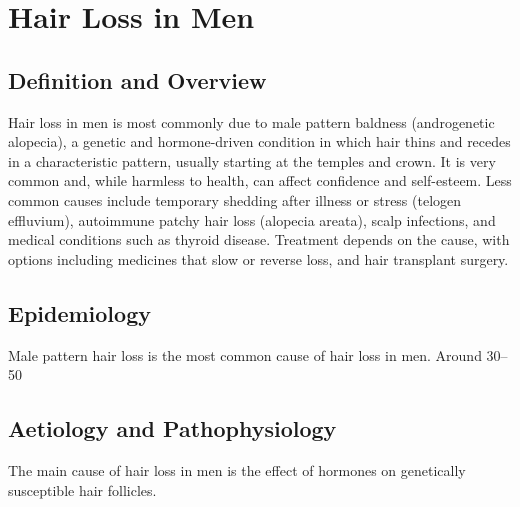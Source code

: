 \chapter{Hair Loss in Men}

\section*{Definition and Overview}
Hair loss in men is most commonly due to male pattern baldness (androgenetic alopecia), a genetic and hormone-driven condition in which hair thins and recedes in a characteristic pattern, usually starting at the temples and crown. It is very common and, while harmless to health, can affect confidence and self-esteem. Less common causes include temporary shedding after illness or stress (telogen effluvium), autoimmune patchy hair loss (alopecia areata), scalp infections, and medical conditions such as thyroid disease. Treatment depends on the cause, with options including medicines that slow or reverse loss, and hair transplant surgery.

\section*{Epidemiology}
Male pattern hair loss is the most common cause of hair loss in men. Around 30--50%

\section*{Aetiology and Pathophysiology}
The main cause of hair loss in men is the effect of hormones on genetically susceptible hair follicles.

